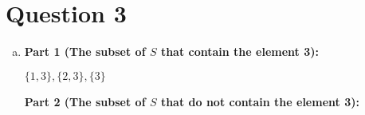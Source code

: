 \documentclass[12pt]{article}
\begin{document}
\section*{Question 3}
\begin{enumerate}[a.]
    \item

    \textbf{Part 1 (The subset of $S$ that contain the element 3):}

    $\{1,3\}, \{2,3\}, \{3\}$

    \bigskip

    \textbf{Part 2 (The subset of $S$ that do not contain the element 3):}
\end{enumerate}
\end{document}
